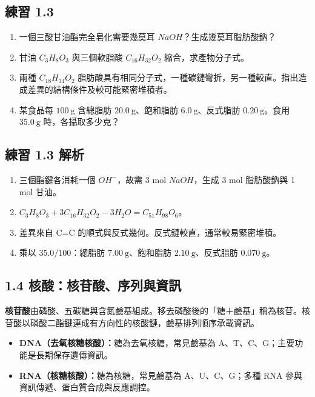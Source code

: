 \documentclass[11pt,a4paper]{article}
\providecommand{\tightlist}{%
  \setlength{\itemsep}{0pt}\setlength{\parskip}{0pt}}
\begin{document}
\subsection{練習 1.3}\label{ux7df4ux7fd2-1.3}

\begin{enumerate}
\def\labelenumi{\arabic{enumi}.}
\tightlist
\item
  一個三酸甘油酯完全皂化需要幾莫耳 \(NaOH\)？生成幾莫耳脂肪酸鈉？
\item
  甘油 \(C_3H_8O_3\) 與三個軟脂酸 \(C_{16}H_{32}O_2\) 縮合，求產物分子式。
\item
  兩種 \(C_{18}H_{34}O_2\) 脂肪酸具有相同分子式，一種碳鏈彎折，另一種較直。指出造成差異的結構條件及較可能緊密堆積者。
\item
  某食品每 \(100\ \mathrm g\) 含總脂肪 \(20.0\ \mathrm g\)、飽和脂肪 \(6.0\ \mathrm g\)、反式脂肪 \(0.20\ \mathrm g\)。食用 \(35.0\ \mathrm g\) 時，各攝取多少克？
\end{enumerate}

\subsection{練習 1.3 解析}\label{ux7df4ux7fd2-1.3-ux89e3ux6790}

\begin{enumerate}
\def\labelenumi{\arabic{enumi}.}
\tightlist
\item
  三個酯鍵各消耗一個 \(OH^-\)，故需 3 mol \(NaOH\)，生成 3 mol 脂肪酸鈉與 1 mol 甘油。
\item
  \(C_3H_8O_3+3C_{16}H_{32}O_2-3H_2O=C_{51}H_{98}O_6\)。
\item
  差異來自 C=C 的順式與反式幾何。反式鏈較直，通常較易緊密堆積。
\item
  乘以 \(35.0/100\)：總脂肪 \(7.00\ \mathrm g\)、飽和脂肪 \(2.10\ \mathrm g\)、反式脂肪 \(0.070\ \mathrm g\)。
\end{enumerate}

\subsection{1.4 核酸：核苷酸、序列與資訊}\label{ux6838ux9178ux6838ux82f7ux9178ux5e8fux5217ux8207ux8cc7ux8a0a}

\textbf{核苷酸}由磷酸、五碳糖與含氮鹼基組成。移去磷酸後的「糖＋鹼基」稱為核苷。核苷酸以磷酸二酯鍵連成有方向性的核酸鏈，鹼基排列順序承載資訊。

\begin{itemize}
\tightlist
\item
  \textbf{DNA（去氧核糖核酸）：}糖為去氧核糖，常見鹼基為 A、T、C、G；主要功能是長期保存遺傳資訊。
\item
  \textbf{RNA（核糖核酸）：}糖為核糖，常見鹼基為 A、U、C、G；多種 RNA 參與資訊傳遞、蛋白質合成與反應調控。
\end{itemize}
\end{document}
